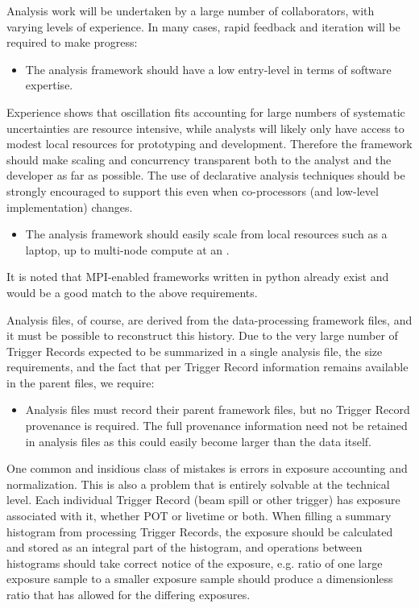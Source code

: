 \documentclass[../main-v1.tex]{subfiles}
\begin{document}
Analysis work will be undertaken by a large number of collaborators, with varying levels of experience. In many cases, rapid feedback and iteration will be required to make progress:

\begin{itemize}
\item The analysis framework should have a low entry-level in terms of software expertise.
\end{itemize}

Experience shows that oscillation fits accounting for large numbers of systematic uncertainties are resource intensive, while analysts will likely only have access to modest local resources for prototyping and development.  Therefore the framework should make scaling and concurrency transparent both to the analyst and the developer as far as possible.  The use of declarative analysis techniques should be strongly encouraged to support this even when co-processors (and low-level implementation) changes.

\begin{itemize}
\item The analysis framework should easily scale from local resources such as a laptop, up to multi-node compute at an .
\end{itemize}

It is noted that MPI-enabled frameworks written in python already exist and would be a good match to the above requirements.

Analysis files, of course, are derived from the data-processing framework files, and it must be possible to reconstruct this history. Due to the very large number of Trigger Records expected to be summarized in a single analysis file, the size requirements, and the fact that per Trigger Record information remains available in the parent files, we require:

\begin{itemize}

\item Analysis files must record their parent framework files, but no Trigger Record provenance is required.  The full provenance information need not be retained in analysis files as this could easily become larger than the data itself.
\end{itemize}

One common and insidious class of mistakes is errors in exposure accounting and normalization. This is also a problem that is entirely solvable at the technical level.  Each individual Trigger Record (beam spill or other trigger) has exposure associated with it, whether POT or livetime or both. When filling a summary histogram from processing Trigger Records, the exposure should be calculated and stored as an integral part of the histogram, and operations between histograms should take correct notice of the exposure, e.g. ratio of one large exposure sample to a smaller exposure sample should produce a dimensionless ratio that has allowed for the differing exposures.
\end{document}
